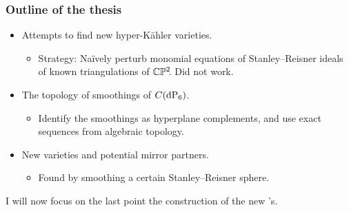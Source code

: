\begin{frame}
\frametitle{Outline of the thesis}

\begin{itemize}
    \item<1->
    Attempts to find new hyper-Kähler varieties. \pause
    \begin{itemize}
        \item
	Strategy: Naïvely perturb monomial equations of Stanley--Reisner ideals of known triangulations of $\mathbb{C} \mathbb{P}^2\mkern-4mu$. \alert{Did not work.} \pause
    \end{itemize}

    \item<2->
    The topology of smoothings of $C(\dP6)$. \pause
    \begin{itemize}
        \item
        Identify the smoothings as hyperplane complements, and use exact sequences from algebraic topology. \pause
    \end{itemize}

    \item<3->
    New \CY varieties and potential mirror partners. \pause
    \begin{itemize}
        \item
        Found by smoothing a certain Stanley--Reisner sphere.
    \end{itemize}
\end{itemize}
\pause

I will now focus on the last point \dash the construction of the new \CY's.

\end{frame}